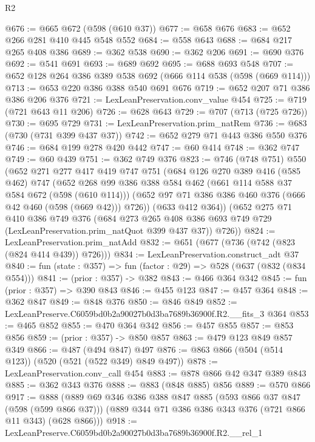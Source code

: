 \begin{lexlean}{R2}
\begin{coremodule}
@676 := @665 @672 (@598 (@610 @37))
@677 := @658 @676
@683 := @652 @266 @281 @410 @445 @548 @552
@684 := @558 @643
@688 := @684 @217 @265 @408 @386
@689 := @362 @538
@690 := @362 @206
@691 := @690 @376
@692 := @541 @691
@693 := @689 @692
@695 := @688 @693 @548
@707 := @652 @128 @264 @386 @389 @538 @692 (@666 @114 @538 (@598 (@669 @114)))
@713 := @653 @220 @386 @388 @540 @691 @676
@719 := @652 @207 @71 @386 @386 @206 @376
@721 := LexLeanPreservation.conv_value @454
@725 := @719 (@721 @643 @11 @206)
@726 := @628 @643
@729 := @707 (@713 (@725 @726))
@730 := @695 @729
@731 := LexLeanPreservation.prim_natRem
@736 := @683 (@730 (@731 @399 @437 @37))
@742 := @652 @279 @71 @443 @386 @550 @376
@746 := @684 @199 @278 @420 @442
@747 := @60 @414
@748 := @362 @747
@749 := @60 @439
@751 := @362 @749 @376
@823 := @746
    (@748 @751)
    @550
    (@652
      @271
      @277
      @417
      @419
      @747
      @751
      (@684
        @126
        @270
        @389
        @416
        (@585 @462)
        @747
        (@652
          @268
          @99
          @386
          @388
          @584
          @462
          (@661 @114 @588 @37 @584 @672 (@598 (@610 @114)))
          (@652 @97 @71 @386 @386 @460 @376 (@666 @42 @460 (@598 (@669 @42))) @726))
        (@633 @412 @364))
      (@652
        @275
        @71
        @410
        @386
        @749
        @376
        (@684 @273 @265 @408 @386 @693 @749 @729 (LexLeanPreservation.prim_natQuot @399 @437 @37))
        @726))
@824 := LexLeanPreservation.prim_natAdd
@832 := @651 (@677 (@736 (@742 (@823 (@824 @414 @439)) @726)))
@834 := LexLeanPreservation.construct_adt @37
@840 := fun (state : @357) => fun (factor : @29) => @528 (@637 (@832 (@834 @554)))
@841 := (prior : @357) -> @382
@843 := @466 @364 @342
@845 := fun (prior : @357) => @390 @843
@846 := @455 @123
@847 := @457 @364
@848 := @362 @847
@849 := @848 @376
@850 := @846 @849
@852 := LexLeanPreserve.C6059bd0b2a90027b0d3ba7689b36900f.R2.__fits_3 @364
@853 := @465 @852
@855 := @470 @364 @342
@856 := @457 @855
@857 := @853 @856
@859 := (prior : @357) -> @850 @857
@863 := @479 @123 @849 @857 @349
@866 := @487 (@494 @847) @497
@876 := @863 @866 (@504 (@514 @123)) (@520 (@521 (@522 @349) @849 @497))
@878 := LexLeanPreservation.conv_call @454
@883 := @878 @866 @42 @347 @389 @843
@885 := @362 @343 @376
@888 := @883 (@848 @885) @856
@889 := @570 @866
@917 := @888
    (@889
      @69
      @346
      @386
      @388
      @847
      @885
      (@593 @866 @37 @847 (@598 (@599 @866 @37)))
      (@889 @344 @71 @386 @386 @343 @376 (@721 @866 @11 @343) (@628 @866)))
@918 := LexLeanPreserve.C6059bd0b2a90027b0d3ba7689b36900f.R2.__rel_1

\end{coremodule}
\end{lexlean}
